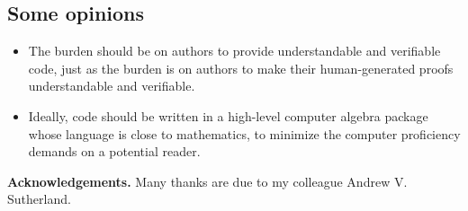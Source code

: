 \subsection {Some opinions}

\begin{itemize}
\item
The burden should be on authors 
to provide understandable and verifiable code,
just as the burden is on authors to make their human-generated proofs 
understandable and verifiable.
\item 
Ideally, code should be written in a high-level computer algebra package
whose language is close to mathematics,
to minimize the computer proficiency demands on a potential reader.
\end{itemize}

{\bf Acknowledgements.} Many thanks are due to my colleague Andrew V. Sutherland.
